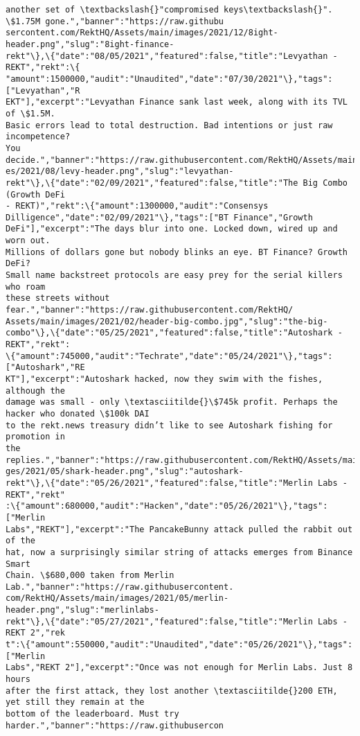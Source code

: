 \documentclass[11pt]{article}
\begin{document}
\begin{Verbatim}[commandchars=\\\{\}]
another set of \textbackslash{}"compromised keys\textbackslash{}". \$1.75M gone.","banner":"https://raw.githubu
sercontent.com/RektHQ/Assets/main/images/2021/12/8ight-
header.png","slug":"8ight-finance-
rekt"\},\{"date":"08/05/2021","featured":false,"title":"Levyathan - REKT","rekt":\{
"amount":1500000,"audit":"Unaudited","date":"07/30/2021"\},"tags":["Levyathan","R
EKT"],"excerpt":"Levyathan Finance sank last week, along with its TVL of \$1.5M.
Basic errors lead to total destruction. Bad intentions or just raw incompetence?
You decide.","banner":"https://raw.githubusercontent.com/RektHQ/Assets/main/imag
es/2021/08/levy-header.png","slug":"levyathan-
rekt"\},\{"date":"02/09/2021","featured":false,"title":"The Big Combo (Growth DeFi
- REKT)","rekt":\{"amount":1300000,"audit":"Consensys
Dilligence","date":"02/09/2021"\},"tags":["BT Finance","Growth
DeFi"],"excerpt":"The days blur into one. Locked down, wired up and worn out.
Millions of dollars gone but nobody blinks an eye. BT Finance? Growth DeFi?
Small name backstreet protocols are easy prey for the serial killers who roam
these streets without fear.","banner":"https://raw.githubusercontent.com/RektHQ/
Assets/main/images/2021/02/header-big-combo.jpg","slug":"the-big-
combo"\},\{"date":"05/25/2021","featured":false,"title":"Autoshark - REKT","rekt":
\{"amount":745000,"audit":"Techrate","date":"05/24/2021"\},"tags":["Autoshark","RE
KT"],"excerpt":"Autoshark hacked, now they swim with the fishes, although the
damage was small - only \textasciitilde{}\$745k profit. Perhaps the hacker who donated \$100k DAI
to the rekt.news treasury didn’t like to see Autoshark fishing for promotion in
the replies.","banner":"https://raw.githubusercontent.com/RektHQ/Assets/main/ima
ges/2021/05/shark-header.png","slug":"autoshark-
rekt"\},\{"date":"05/26/2021","featured":false,"title":"Merlin Labs - REKT","rekt"
:\{"amount":680000,"audit":"Hacken","date":"05/26/2021"\},"tags":["Merlin
Labs","REKT"],"excerpt":"The PancakeBunny attack pulled the rabbit out of the
hat, now a surprisingly similar string of attacks emerges from Binance Smart
Chain. \$680,000 taken from Merlin Lab.","banner":"https://raw.githubusercontent.
com/RektHQ/Assets/main/images/2021/05/merlin-header.png","slug":"merlinlabs-
rekt"\},\{"date":"05/27/2021","featured":false,"title":"Merlin Labs - REKT 2","rek
t":\{"amount":550000,"audit":"Unaudited","date":"05/26/2021"\},"tags":["Merlin
Labs","REKT 2"],"excerpt":"Once was not enough for Merlin Labs. Just 8 hours
after the first attack, they lost another \textasciitilde{}200 ETH, yet still they remain at the
bottom of the leaderboard. Must try harder.","banner":"https://raw.githubusercon

\end{Verbatim}
\end{document}
